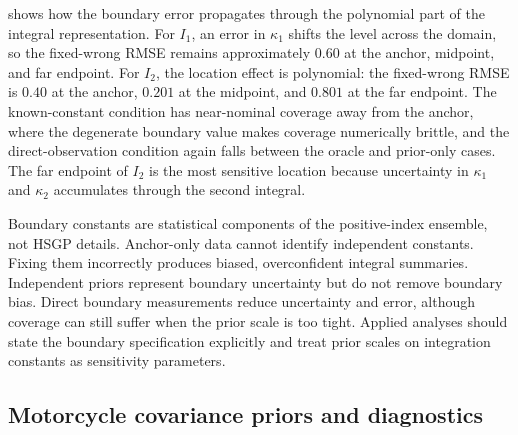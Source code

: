 \documentclass[11pt,a4paper]{article}
\theoremstyle{definition}
\theoremstyle{remark}
\begin{document}
 shows how the boundary error propagates through the polynomial part of the integral representation. For \(I_1\), an error in \(\kappa_1\) shifts the level across the domain, so the fixed-wrong RMSE remains approximately \(0.60\) at the anchor, midpoint, and far endpoint. For \(I_2\), the location effect is polynomial: the fixed-wrong RMSE is \(0.40\) at the anchor, \(0.201\) at the midpoint, and \(0.801\) at the far endpoint. The known-constant condition has near-nominal coverage away from the anchor, where the degenerate boundary value makes coverage numerically brittle, and the direct-observation condition again falls between the oracle and prior-only cases. The far endpoint of \(I_2\) is the most sensitive location because uncertainty in \(\kappa_1\) and \(\kappa_2\) accumulates through the second integral.

Boundary constants are statistical components of the positive-index ensemble, not HSGP details. Anchor-only data cannot identify independent constants. Fixing them incorrectly produces biased, overconfident integral summaries. Independent priors represent boundary uncertainty but do not remove boundary bias. Direct boundary measurements reduce uncertainty and error, although coverage can still suffer when the prior scale is too tight. Applied analyses should state the boundary specification explicitly and treat prior scales on integration constants as sensitivity parameters.

\subsection{Motorcycle covariance priors and diagnostics}\label{appendix:additional-application-information}
\end{document}

